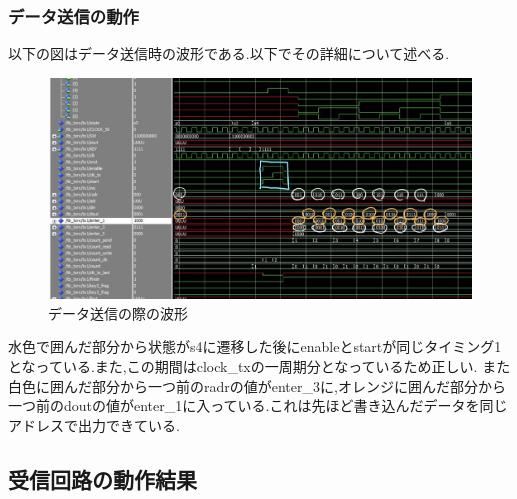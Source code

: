 \documentclass[dvipdfmx]{jarticle}
\begin{document}
\subsubsection{データ送信の動作}
以下の図はデータ送信時の波形である.以下でその詳細について述べる.
\begin{figure}[h]
  \centering
  \includegraphics[width=12cm]{wave_send.jpg}
  \caption{データ送信の際の波形}
\end{figure}
水色で囲んだ部分から状態がs4に遷移した後にenableとstartが同じタイミング1となっている.また,この期間はclock\_txの一周期分となっているため正しい.
また白色に囲んだ部分から一つ前のradrの値がenter\_3に,オレンジに囲んだ部分から一つ前のdoutの値がenter\_1に入っている.これは先ほど書き込んだデータを同じアドレスで出力できている.
\subsection{受信回路の動作結果}
\end{document}
